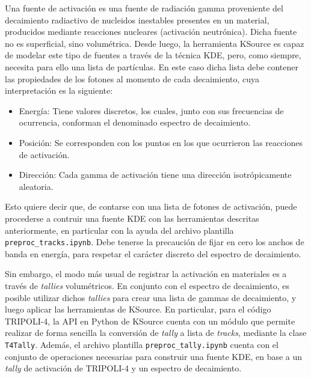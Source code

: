 Una fuente de activación es una fuente de radiación gamma proveniente del decaimiento radiactivo de nucleidos inestables presentes en un material, producidos mediante reacciones nucleares (activación neutrónica). Dicha fuente no es superficial, sino volumétrica. Desde luego, la herramienta KSource es capaz de modelar este tipo de fuentes a través de la técnica KDE, pero, como siempre, necesita para ello una lista de partículas. En este caso dicha lista debe contener las propiedades de los fotones al momento de cada decaimiento, cuya interpretación es la siguiente:
\begin{itemize}
	\item Energía: Tiene valores discretos, los cuales, junto con sus frecuencias de ocurrencia, conforman el denominado espectro de decaimiento.
	\item Posición: Se corresponden con los puntos en los que ocurrieron las reacciones de activación.
	\item Dirección: Cada gamma de activación tiene una dirección isotrópicamente aleatoria.
\end{itemize}

Esto quiere decir que, de contarse con una lista de fotones de activación, puede procederse a contruir una fuente KDE con las herramientas descritas anteriormente, en particular con la ayuda del archivo plantilla \verb|preproc_tracks.ipynb|. Debe tenerse la precaución de fijar en cero los anchos de banda en energía, para respetar el carácter discreto del espectro de decaimiento.

Sin embargo, el modo más usual de registrar la activación en materiales es a través de \emph{tallies} volumétricos. En conjunto con el espectro de decaimiento, es posible utilizar dichos \emph{tallies} para crear una lista de gammas de decaimiento, y luego aplicar las herramientas de KSource. En particular, para el código TRIPOLI-4, la API en Python de KSource cuenta con un módulo que permite realizar de forma sencilla la conversión de \emph{tally} a lista de \emph{tracks}, mediante la clase \verb|T4Tally|. Además, el archivo plantilla \verb|preproc_tally.ipynb| cuenta con el conjunto de operaciones necesarias para construir una fuente KDE, en base a un \emph{tally} de activación de TRIPOLI-4 y un espectro de decaimiento. 
